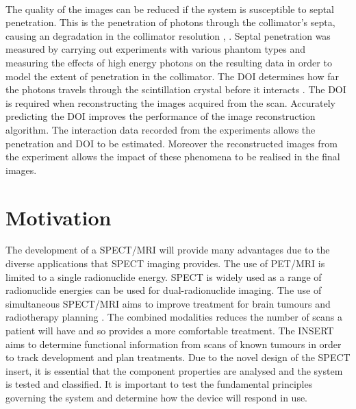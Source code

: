 \paragraph{} 
The quality of the images can be reduced if the system is susceptible to septal penetration. This is the penetration of photons through the collimator's septa, causing an degradation in the collimator resolution \cite{0031-9155-18-6-005}, \cite{0031-9155-50-21-004}. Septal penetration was measured by carrying out experiments with various phantom types and measuring the effects of high energy photons on the resulting data in order to model the extent of penetration in the collimator. The DOI determines how far the photons travels through the scintillation crystal before it interacts \cite{0031-9155-55-2-N04}. The DOI is required when reconstructing the images acquired from the scan. Accurately predicting the DOI improves the performance of the image reconstruction algorithm. The interaction data recorded from the experiments allows the penetration and DOI to be estimated. Moreover the reconstructed images from the experiment allows the impact of these phenomena to be realised in the final images.

\section{Motivation}
The development of a SPECT/MRI will provide many advantages due to the diverse applications that SPECT imaging provides. The use of PET/MRI is limited to a single radionuclide energy. SPECT is widely used as a range of radionuclide energies can be used for dual-radionuclide imaging. The use of simultaneous SPECT/MRI aims to improve treatment for brain tumours and radiotherapy planning \cite{doi:10.1259/bjr.20160690}. The combined modalities reduces the number of scans a patient will have and so provides a more comfortable treatment. The INSERT aims to determine functional information from scans of known tumours in order to track development and plan treatments. Due to the novel design of the SPECT insert, it is essential that the component properties are analysed and the system is tested and classified. It is important to test the fundamental principles governing the system and determine how the device will respond in use.
